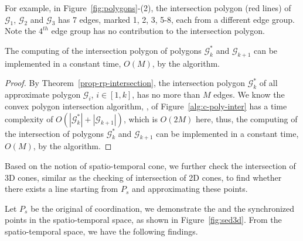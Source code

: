 For example, in Figure~\ref{fig:polygons}-(2), the intersection polygon (red lines) of $\mathcal{G}_1$, $\mathcal{G}_2$ and $\mathcal{G}_3$ has 7 edges, marked 1, 2, 3, 5-8, each from a different edge group. Note the $4^{th}$ edge group has no contribution to the intersection polygon.

\begin{prop}
\label{prop-cpi-time}
The computing of the intersection polygon of polygons $\mathcal{G}^*_k$ and $\mathcal{G}_{k+1}$ can be implemented in a constant time, \ie $O(M)$, by the \cpia algorithm.
\end{prop}

\begin{proof}
By Theorem~\ref{prop-rp-intersection}, the intersection polygon $\mathcal{G}^*_k$ of all approximate polygon $\mathcal{G}_i$, $i \in [1, k]$, has no more than $M$ edges.
We know the convex polygon intersection algorithm, \ie \cpia, of Figure~\ref{alg:c-poly-inter} has a time complexity of $O(|\mathcal{G}^*_k| + |\mathcal{G}_{k+1}|)$, which is $O(2M)$ here, thus, the computing of the intersection of polygons $\mathcal{G}^*_k$ and $\mathcal{G}_{k+1}$ can be implemented in a constant time, \ie $O(M)$, by the \cpia algorithm.
\end{proof}



Based on the notion of spatio-temporal cone, we further check the intersection of 3D cones, similar as the checking of intersection of 2D cones, to find whether there exists a line starting from $P_s$ and approximating these points.


Let $P_s$ be the original of coordination, we demonstrate the \sed and the synchronized points in the spatio-temporal space, as shown in Figure~\ref{fig:sed3d}.
From the spatio-temporal space, we have the following findings.






